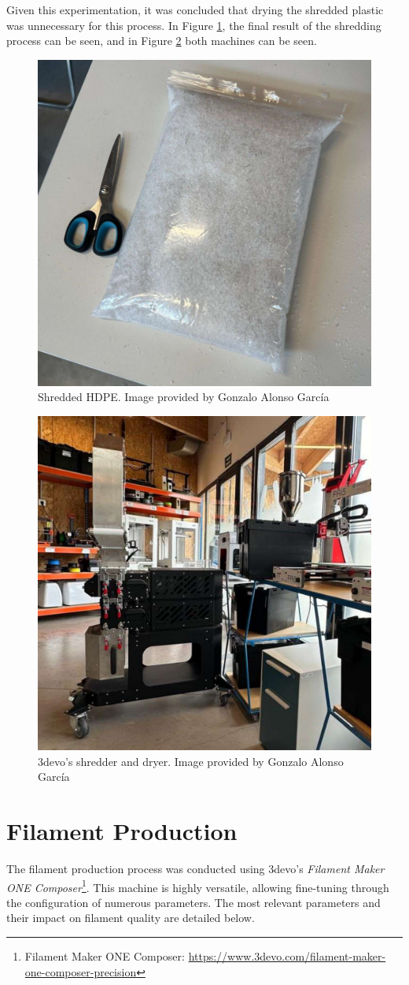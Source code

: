 Given this experimentation, it was concluded that drying the shredded plastic was unnecessary for 
this process. In Figure \ref{fig:shredded_filament}, the final result of the shredding process can 
be seen, and in Figure \ref{fig:shredder_dryer} both machines can be seen.

\begin{figure}[h]
	\centering
	\includegraphics[width = .6\textwidth]{Imagenes/Vectorial/shredded_filament.pdf}
	\caption{Shredded HDPE. Image provided by Gonzalo Alonso García}
	\label{fig:shredded_filament}
\end{figure}

\begin{figure}[h]
	\centering
	\includegraphics[width = .6\textwidth]{Imagenes/Vectorial/shredder_dryer.pdf}
	\caption{3devo's shredder and dryer. Image provided by Gonzalo Alonso García}
	\label{fig:shredder_dryer}
\end{figure}


\section{Filament Production}
The filament production process was conducted using 3devo's \textit{Filament Maker ONE 
Composer}\footnote{Filament Maker ONE Composer: 
\url{https://www.3devo.com/filament-maker-one-composer-precision}}. This machine is highly 
versatile, allowing fine-tuning through the configuration of numerous parameters. The most 
relevant parameters and their impact on filament quality are detailed below.

